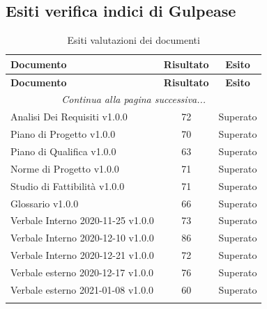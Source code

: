 \documentclass[../piano_di_qualifica.tex]{subfiles}
\begin{document}
\subsection{Esiti verifica indici di Gulpease}
\label{sub:verif_gul}

\begin{center}
	\begin{longtable}{|l|c|c|}
		\hline
		\rowcolor{lightgray}
		\textbf{Documento}                 & \textbf{Risultato} & \textbf{Esito} \\
		\hline
		\endfirsthead
	
		\hline
		\rowcolor{lightgray}
		\textbf{Documento}                 & \textbf{Risultato} & \textbf{Esito} \\
		\hline
		\endhead
		
		\hline
		\multicolumn{3}{|c|}{\emph{Continua alla pagina successiva...}}\\
		\hline
		\endfoot

		\endlastfoot

		Analisi Dei Requisiti v1.0.0       & 72                 & Superato       \\
		Piano di Progetto v1.0.0           & 70                 & Superato       \\
		Piano di Qualifica v1.0.0          & 63                 & Superato       \\
		Norme di Progetto v1.0.0           & 71                 & Superato       \\
		Studio di Fattibilità v1.0.0       & 71                 & Superato       \\
		Glossario v1.0.0                   & 66                 & Superato       \\
		Verbale Interno 2020-11-25 v1.0.0  & 73                 & Superato       \\
		Verbale Interno 2020-12-10 v1.0.0  & 86                 & Superato       \\
		Verbale Interno 2020-12-21 v1.0.0  & 72                 & Superato       \\
		Verbale esterno 2020-12-17  v1.0.0 & 76                 & Superato       \\
		Verbale esterno 2021-01-08  v1.0.0 & 60                 & Superato       \\
		\hline
		\caption{Esiti valutazioni dei documenti}
	\end{longtable}
\end{center}
\end{document}
